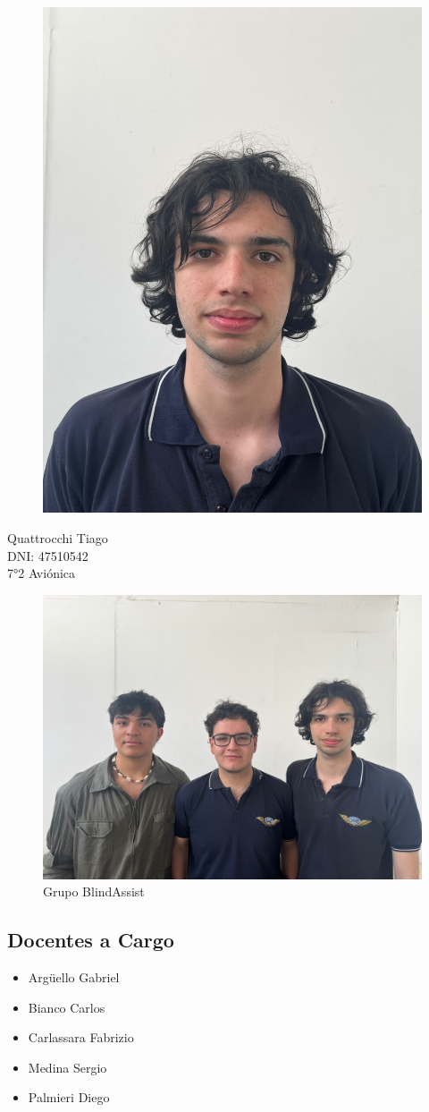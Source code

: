 \documentclass[12pt,a4paper]{article}
\begin{document}
\begin{figure}[H]
    \centering
    \includegraphics[width=0.4\linewidth]{Carpeta tecnica/Fototiago.jpg}
\end{figure}

\begin{center}
Quattrocchi Tiago\\
DNI: 47510542\\
7°2 Aviónica
\end{center}

\begin{figure}[H]
    \centering
    \includegraphics[width=0.7\linewidth]{Carpeta tecnica/Fotogrupo.jpg}
    \caption{Grupo BlindAssist}
\end{figure}

\subsection{Docentes a Cargo}
    \begin{center}
        \begin{itemize}
        \item Argüello Gabriel
        \item Bianco Carlos
        \item Carlassara Fabrizio
        \item Medina Sergio
        \item Palmieri Diego
        \end{itemize}
    \end{center}
\end{document}
